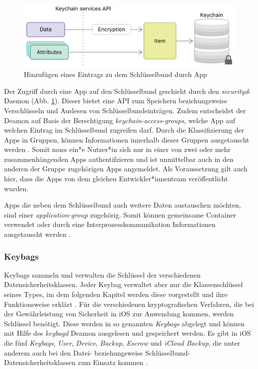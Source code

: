 \begin{figure}[h]
	\centering
  		\includegraphics[width=1\textwidth]{../images/keychain-api-example}
		\caption{Hinzufügen eines Eintrags zu dem Schlüsselbund durch App \cite{apple2020keychain_items}}
		\label{fig:add-entry-to-keychain}
\end{figure}

Der Zugriff durch eine App auf den Schlüsselbund geschieht durch den
\textit{securityd}-Daemon (Abb. \ref{fig:add-entry-to-keychain}). Dieser bietet
eine API zum Speichern beziehungsweise Verschlüsseln und Auslesen von
Schlüsselbundeinträgen. Zudem  entscheidet der Deamon auf Basis der Berechtigung
\textit{keychain-access-groups}, welche App auf welchen Eintrag im Schlüsselbund
zugreifen darf. Durch die Klassifizierung der Apps in Gruppen, können
Informationen innerhalb dieser Gruppen ausgetauscht werden
\cite{apple2020keychain_item_groups}. Somit muss ein*e Nutzer*in sich nur in
einer von zwei oder mehr zusammenhängenden Apps authentifzieren und ist
unmittelbar auch in den anderen der Gruppe zugehörigen Apps angemeldet. Als
Voraussetzung gilt auch hier, dass die Apps von dem gleichen
Entwickler*innenteam veröffentlicht wurden.

Apps die neben dem Schlüsselbund auch weitere Daten austauschen möchten, sind
einer \textit{application-group} zugehörig.  Somit können gemeinsame Container
verwendet oder durch eine Interprozesskommunikation Informationen ausgetauscht
werden \cite{apple2020keychain_application_groups}. 

\subsubsection{Keybags}
Keybags sammeln und verwalten die Schlüssel der verschiedenen
Datensicherheitsklassen. Jeder Keybag verwaltet aber nur die Klassenschlüssel
seines Types, im dem folgenden Kapitel werden diese vorgestellt und ihre
Funktionsweise erklärt \cite{apple2020}.  Für die verschiedenen kryptografischen
Verfahren, die bei der Gewährleistung von Sicherheit in iOS zur Anwendung
kommen, werden Schlüssel benötigt. Diese werden in so genannten \textit{Keybags}
abgelegt und können mit Hilfe des \textit{keybagd} Deamon ausgelesen und
gespeichert werden.  Es gibt in iOS die fünf \textit{Keybags}, \textit{User},
\textit{Device}, \textit{Backup}, \textit{Escrow} und \textit{iCloud Backup},
die unter anderem auch bei den Datei- beziehungsweise
Schlüsselbund-Datensicherheitsklassen zum Einsatz kommen \cite{apple2020}.

